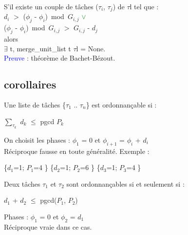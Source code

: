 \documentclass[t]{beamer}
\begin{document}
 {

  S'il existe un couple de tâches ($\tau_i$, $\tau_j$) de $\tau$l tel que : \\
  \hsp\hsp $d_i$ $>$ ($\phi_j$ - $\phi_i$)\ mod\ $G_{i,j}$ \textcolor{green}{$\vee$} \\
  \hsp\hsp ($\phi_j$ - $\phi_i$)\ mod\ $G_{i,j}$ $>$ $G_{i,j}$ - $d_j$ \\
  alors \\
  \hsp\hsp $\exists$ t, merge\_unit\_list t $\tau$l = None. \\
  \vsp
  \textcolor{blue}{Preuve} : théorème de Bachet-Bézout. \\
  \vsp
}

\subsection{corollaires}

 {

  Une liste de tâches \{$\tau_1$ .. $\tau_n$\} est ordonnançable si :
  \begin{center}
    $\sum_{\tau_k}$ $d_k$ $\le$ pgcd $P_k$
  \end{center}
  On choisit les phases : $\phi_1$ = 0 et $\phi_{i+1}$ = $\phi_i$ + $d_i$ \\
  \vsp
  Réciproque fausse en toute généralité. Exemple :
  \begin{center}
    \{$d_1$=1; $P_1$=4 \}
    \{$d_2$=1; $P_2$=6 \}
    \{$d_3$=1; $P_3$=4 \} \\
    \vsp
  \end{center}
}

 {

  Deux tâches $\tau_1$ et $\tau_2$ sont ordonnançables si et seulement si :
  \begin{center}
    $d_1$ + $d_2$ $\le$ pgcd($P_1$, $P_2$)
  \end{center}
  Phases : $\phi_1$ = 0 et $\phi_2$ = $d_1$ \\
  \vsp
  Réciproque vraie dans ce cas.

}
\end{document}
